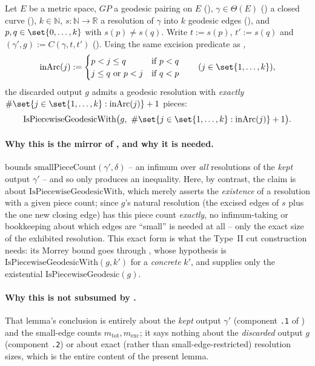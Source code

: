 \begin{lemma}
  Let $E$ be a metric space, $GP$ a geodesic pairing on $E$ (), $\gamma \in
  \Theta(E)$ () a closed curve (), $k \in \mathbb{N}$, $s
  \colon \mathbb{N} \to \mathbb{R}$ a resolution of $\gamma$ into $k$ geodesic edges
  (), and $p,q \in \set{0,\dots,k}$ with $s(p) \ne s(q)$. Write $t :=
  s(p)$, $t' := s(q)$ and $(\gamma',g) := C(\gamma,t,t')$ (). Using the same
  excision predicate as ,
  \[
    \mathrm{inArc}(j) :=
    \begin{cases}
      p < j \le q & \text{if } p<q \\
      j \le q \text{ or } p < j & \text{if } q<p
    \end{cases}
    \qquad (j \in \set{1,\dots,k})
    ,
  \]
  the discarded output $g$ admits a geodesic resolution with \emph{exactly}
  $\#\set{j\in\set{1,\dots,k} : \mathrm{inArc}(j)} + 1$ pieces:
  \[
    \mathrm{IsPiecewiseGeodesicWith}\bigl(g,\ \#\set{j\in\set{1,\dots,k} : \mathrm{inArc}(j)} + 1\bigr)
    .
  \]

  \paragraph{Why this is the mirror of , and why it is
  needed.}  bounds $\mathrm{smallPieceCount}(\gamma',\delta)$
  -- an infimum over \emph{all} resolutions of the \emph{kept} output $\gamma'$ -- and so only
  produces an inequality. Here, by contrast, the claim is about $\mathrm{IsPiecewiseGeodesicWith}$,
  which merely asserts the \emph{existence} of a resolution with a given piece count; since $g$'s
  natural resolution (the excised edges of $s$ plus the one new closing edge) has this piece count
  \emph{exactly}, no infimum-taking or bookkeeping about which edges are ``small'' is needed at all
  -- only the exact size of the exhibited resolution. This exact form is what the Type~II cut
  construction needs: its Morrey bound goes through , whose hypothesis is
  $\mathrm{IsPiecewiseGeodesicWith}(g,k')$ for a \emph{concrete} $k'$, and
   supplies only the existential $\mathrm{IsPiecewiseGeodesic}(g)$.

  \paragraph{Why this is not subsumed by .} That lemma's
  conclusion is entirely about the \emph{kept} output $\gamma'$ (component \texttt{.1} of
  ) and the small-edge counts $m_{\mathrm{tot}},m_{\mathrm{exc}}$; it says nothing
  about the \emph{discarded} output $g$ (component \texttt{.2}) or about exact (rather than
  small-edge-restricted) resolution sizes, which is the entire content of the present lemma.
\end{lemma}
